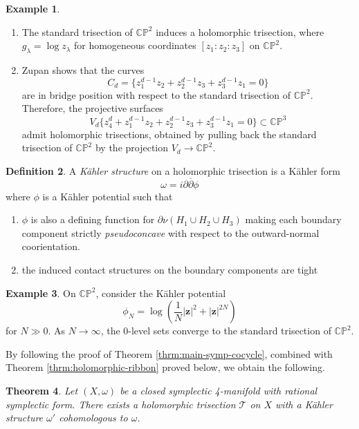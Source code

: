 \documentclass[11pt]{amsart}
\newtheorem{theorem}{Theorem}[section]
\theoremstyle{definition}
\newtheorem{definition}[theorem]{Definition}
\newtheorem{example}[theorem]{Example}
\theoremstyle{remark}
\numberwithin{equation}{section}
\newcommand{\dbar}{\overline{\del}}
\newcommand{\cT}{\mathcal{T}}
\newcommand{\CP}{\mathbb{CP}}
\newcommand{\del}{\partial}
\begin{document}
\begin{example}
\begin{enumerate}
    \item The standard trisection of $\CP^2$ induces a holomorphic trisection, where $g_{\lambda} = \log z_{\lambda}$ for homogeneous coordinates $[z_1:z_2:z_3]$ on $\CP^2$.
    \item Zupan \cite{Zupan} shows that the curves
    \[C_d = \{z_1^{d-1}z_2 + z_2^{d-1}z_3 + z_3^{d-1}z_1 = 0\} \]
    are in bridge position with respect to the standard trisection of $\CP^2$.  Therefore, the projective surfaces
    \[V_d \{z_4^d + z_1^{d-1}z_2 + z_2^{d-1}z_3 + z_3^{d-1}z_1 = 0 \} \subset \CP^3 \]
    admit holomorphic trisections, obtained by pulling back the standard trisection of $\CP^2$ by the projection $V_d \rightarrow \CP^2$.
\end{enumerate}
\end{example}

\begin{definition}
    A {\it K\"ahler structure} on a holomorphic trisection is a K\"ahler form
    \[\omega = i \del \dbar \phi\]
    where $\phi$ is a K\"ahler potential such that
    \begin{enumerate}
        \item $\phi$ is also a defining function for $\partial \nu(H_1 \cup H_2 \cup H_3)$ making each boundary component strictly {\it pseudoconcave} with respect to the outward-normal coorientation.
        \item the induced contact structures on the boundary components are tight
    \end{enumerate}
\end{definition}

\begin{example}
\label{ex:Kahler-potential-cp2}
    On $\CP^2$, consider the K\"ahler potential
    \[\phi_N = \log( \frac{1}{N} |\mathbf{z}|^2 + |\mathbf{z}|^{2N})\]
    for $N \gg 0$. As $N \rightarrow \infty$, the 0-level sets converge to the standard trisection of $\CP^2$.
\end{example}

By following the proof of Theorem \ref{thrm:main-symp-cocycle}, combined with Theorem \ref{thrm:holomorphic-ribbon} proved below, we obtain the following.

\begin{theorem}
\label{thrm:kahler-structure-general}
    Let $(X,\omega)$ be a closed symplectic 4-manifold with rational symplectic form.  There exists a holomorphic trisection $\cT$ on $X$ with a K\"ahler structure $\omega'$ cohomologous to $\omega$.
\end{theorem}
\end{document}
